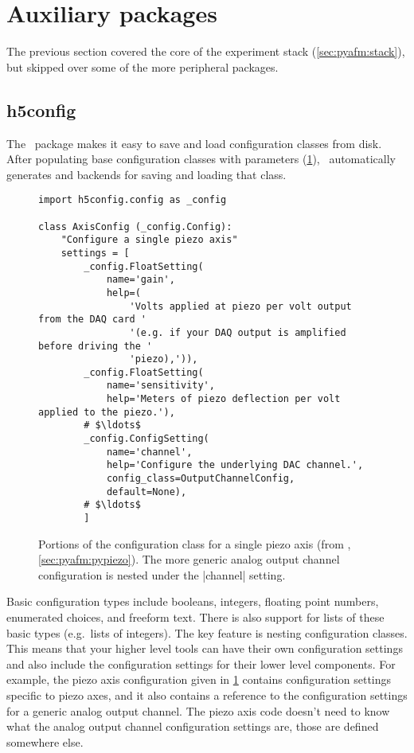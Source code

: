\section{Auxiliary packages}
\label{sec:pyafm:auxiliary}

The previous section covered the core of the experiment stack
(\cref{sec:pyafm:stack}), but skipped over some of the more peripheral
packages.

\subsection{h5config}
\label{sec:pyafm:h5config}

The \hFconfig\ package makes it easy to save and load configuration
classes from disk.  After populating base configuration classes with
parameters (\cref{fig:h5config}), \hFconfig\ automatically generates
 and  backends for saving and
loading that class.

\begin{figure}
  \begin{center}
\begin{verbatim}
import h5config.config as _config

class AxisConfig (_config.Config):
    "Configure a single piezo axis"
    settings = [
        _config.FloatSetting(
            name='gain',
            help=(
                'Volts applied at piezo per volt output from the DAQ card '
                '(e.g. if your DAQ output is amplified before driving the '
                'piezo),')),
        _config.FloatSetting(
            name='sensitivity',
            help='Meters of piezo deflection per volt applied to the piezo.'),
        # $\ldots$
        _config.ConfigSetting(
            name='channel',
            help='Configure the underlying DAC channel.',
            config_class=OutputChannelConfig,
            default=None),
        # $\ldots$
        ]
\end{verbatim}
    \caption{Portions of the configuration class for a single piezo
      axis (from \pypiezo, \cref{sec:pyafm:pypiezo}).  The more
      generic analog output channel configuration is nested under the
      |channel| setting.\label{fig:h5config}}
  \end{center}
\end{figure}

Basic configuration types include booleans, integers, floating point
numbers, enumerated choices, and freeform text.  There is also support
for lists of these basic types (e.g.~lists of integers).  The key
feature is nesting configuration classes.  This means that your higher
level tools can have their own configuration settings and also include
the configuration settings for their lower level components.  For
example, the piezo axis configuration given in \cref{fig:h5config}
contains configuration settings specific to piezo axes, and it also
contains a reference to the configuration settings for a generic
analog output channel.  The piezo axis code doesn't need to know what
the analog output channel configuration settings are, those are
defined somewhere else.

